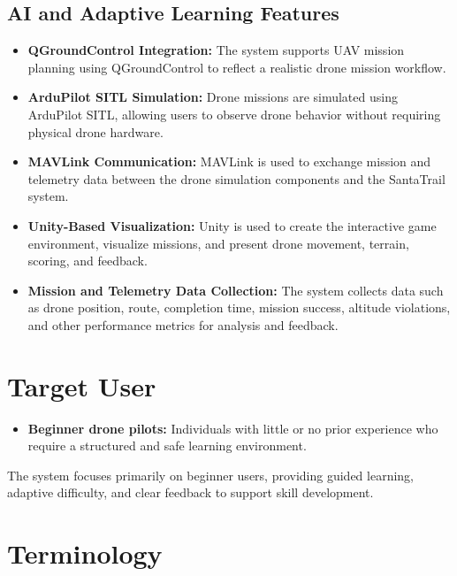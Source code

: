 \subsection{AI and Adaptive Learning Features}
\label{subsection:AI and Adaptive Learning Features}

\begin{itemize}
    \item \textbf{QGroundControl Integration:} The system supports UAV mission planning using QGroundControl to reflect a realistic drone mission workflow.
    \item \textbf{ArduPilot SITL Simulation:} Drone missions are simulated using ArduPilot SITL, allowing users to observe drone behavior without requiring physical drone hardware.
    \item \textbf{MAVLink Communication:} MAVLink is used to exchange mission and telemetry data between the drone simulation components and the SantaTrail system.
    \item \textbf{Unity-Based Visualization:} Unity is used to create the interactive game environment, visualize missions, and present drone movement, terrain, scoring, and feedback.
    \item \textbf{Mission and Telemetry Data Collection:} The system collects data such as drone position, route, completion time, mission success, altitude violations, and other performance metrics for analysis and feedback.
\end{itemize}


\section{Target User}
\label{section:target-user}

\begin{itemize}
    \item \textbf{Beginner drone pilots:} Individuals with little or no prior experience who require a structured and safe learning environment.
\end{itemize}

The system focuses primarily on beginner users, providing guided learning, adaptive difficulty, and clear feedback to support skill development.

\section{Terminology}
\label{section:terminology}

